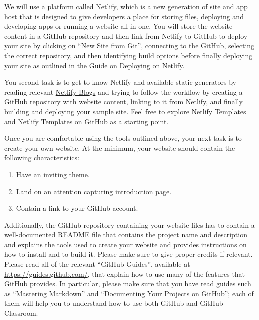 \documentclass[11pt]{article}
\begin{document}
We will use a platform called Netlify, which  is  a new generation of site and app host that is designed to give developers a place for storing files, deploying and developing apps or running a website all in one. You will store the website content in a GitHub repository and then link from Netlify to GitHub to deploy your site by clicking on ``New Site from Git'', connecting to the GitHub, selecting the correct repository, and then identifying build options before finally deploying your site as outlined in the \href{https://www.netlify.com/blog/2016/09/29/a-step-by-step-guide-deploying-on-netlify/}{Guide on Deploying on Netlify}. 

You second task is to get to know Netlify and available static generators by reading relevant \href{https://www.netlify.com/blog/}{Netlify Blogs} and trying to follow the workflow by creating a  GitHub repository with website content, linking  to it from Netlify, and finally building and deploying your sample site. Feel free to explore \href{https://templates.netlify.com/}{Netlify Templates} and \href{https://github.com/netlify-templates}{Netlify Templates on GitHub} as a starting point. 

Once you are comfortable using the tools outlined above, your next task is to create your own website. At the minimum, your website should contain the following characteristics: 
\begin{enumerate}
	\item Have an inviting theme. 
	\item Land on an attention capturing introduction page.
	\item Contain a link to your GitHub account.
\end{enumerate}

Additionally, the GitHub repository containing your website files has to contain a well-documented README file that contains the project name and description and explains the tools used to create your website and provides instructions on how to install and to build it. Please make sure to give proper credits if relevant. Please read all of the relevant ``GitHub Guides'', available at
\url{https://guides.github.com/}, that explain how to use many of the features that GitHub provides. In particular,
please make sure that you have read guides such as ``Mastering Markdown'' and ``Documenting Your Projects on GitHub'';
each of them will help you to understand how to use both GitHub and GitHub Classroom. 
\end{document}
